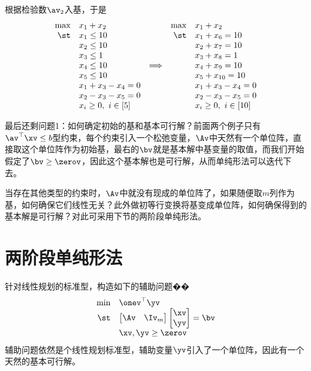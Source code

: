 \documentclass{ctexart}
\begin{document}
\begin{example}[用修正单纯形法求最大流问题]
    根据检验数$\av_2$入基，于是
    \begin{align}
        \begin{array}{rlcrl} %
            \max & x_1 + x_2              &                 & \max & x_1 + x_2               \\
            \st  & x_1 \le 10             &                 & \st  & x_1 + x_6 = 10          \\
                 & x_2 \le 10             &                 &      & x_2 + x_7 = 10          \\
                 & x_3 \le 1              &                 &      & x_3 + x_8 = 1           \\
                 & x_4 \le 10             & \Longrightarrow &      & x_4 + x_9 = 10          \\
                 & x_5 \le 10             &                 &      & x_5 + x_{10} = 10       \\
                 & x_1 + x_3 - x_4 = 0    &                 &      & x_1 + x_3 - x_4 = 0     \\
                 & x_2 - x_3 - x_5 = 0    &                 &      & x_2 - x_3 - x_5 = 0     \\
                 & x_i \ge 0, ~ i \in [5] &                 &      & x_i \ge 0, ~ i \in [10]
        \end{array}
    \end{align}
\end{example}


最后还剩问题1：如何确定初始的基和基本可行解？前面两个例子只有$\av^\top \xv \le b$型约束，每个约束引入一个松弛变量，$\Av$中天然有一个单位阵，直接取这个单位阵作为初始基，最右的$\bv$就是基本解中基变量的取值，而我们开始假定了$\bv \ge \zerov$，因此这个基本解也是可行解，从而单纯形法可以迭代下去。

当存在其他类型的约束时，$\Av$中就没有现成的单位阵了，如果随便取$m$列作为基，如何确保它们线性无关？此外做初等行变换将基变成单位阵，如何确保得到的基本解是可行解？对此可采用下节的两阶段单纯形法。

\section{两阶段单纯形法}

针对线性规划的标准型，构造如下的辅助问题��
\begin{align*}
    \begin{array}{rl}
        \min & \onev^\top \yv      \\
        \st  & \begin{bmatrix}
                   \Av & \Iv_m
               \end{bmatrix}
        \begin{bmatrix}
            \xv \\ \yv
        \end{bmatrix} = \bv        \\
             & \xv, \yv \ge \zerov
    \end{array}
\end{align*}
辅助问题依然是个线性规划标准型，辅助变量$\yv$引入了一个单位阵，因此有一个天然的基本可行解。
\end{document}

